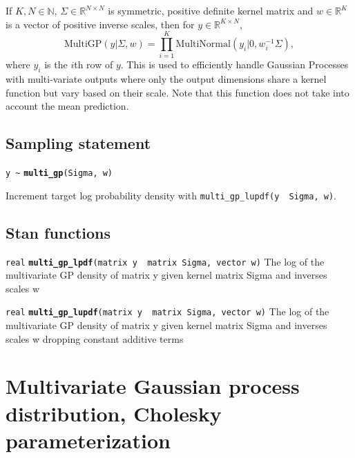 \documentclass[
  10pt,
]{book}
\begin{document}
If \(K,N \in \mathbb{N}\), \(\Sigma \in \mathbb{R}^{N \times N}\) is
symmetric, positive definite kernel matrix and \(w \in \mathbb{R}^{K}\)
is a vector of positive inverse scales, then for \(y \in \mathbb{R}^{K \times N}\), \[ \text{MultiGP}(y|\Sigma,w) = \prod_{i=1}^{K}
\text{MultiNormal}(y_i|0,w_i^{-1} \Sigma), \] where \(y_i\) is the \(i\)th
row of \(y\). This is used to efficiently handle Gaussian Processes
with multi-variate outputs where only the output dimensions share a
kernel function but vary based on their scale. Note that this
function does not take into account the mean prediction.

\hypertarget{sampling-statement-52}{%
\subsection{Sampling statement}\label{sampling-statement-52}}

\texttt{y\ \textasciitilde{}} \textbf{\texttt{multi\_gp}}\texttt{(Sigma,\ w)}

Increment target log probability density with \texttt{multi\_gp\_lupdf(y\ \textbar{}\ Sigma,\ w)}.

\hypertarget{stan-functions-51}{%
\subsection{Stan functions}\label{stan-functions-51}}


\texttt{real} \textbf{\texttt{multi\_gp\_lpdf}}\texttt{(matrix\ y\ \textbar{}\ matrix\ Sigma,\ vector\ w)}\newline
The log of the multivariate GP density of matrix y given kernel matrix
Sigma and inverses scales w


\texttt{real} \textbf{\texttt{multi\_gp\_lupdf}}\texttt{(matrix\ y\ \textbar{}\ matrix\ Sigma,\ vector\ w)}\newline
The log of the multivariate GP density of matrix y given kernel matrix
Sigma and inverses scales w dropping constant additive terms

\hypertarget{multivariate-gaussian-process-distribution-cholesky-parameterization}{%
\section{Multivariate Gaussian process distribution, Cholesky parameterization}\label{multivariate-gaussian-process-distribution-cholesky-parameterization}}
\end{document}
